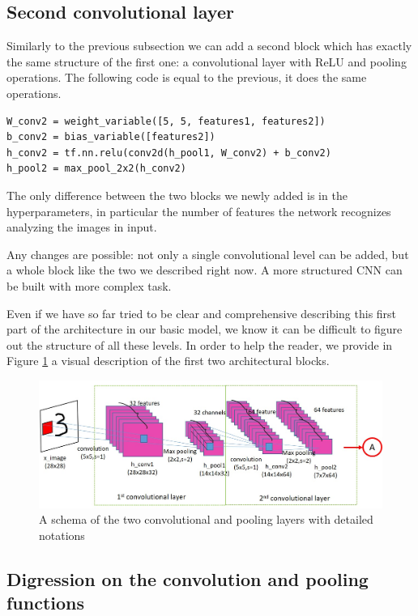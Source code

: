 \subsection{Second convolutional layer}

Similarly to the previous subsection we can add a second block which has exactly the same structure of the first one: a convolutional layer with ReLU and pooling operations. The following code is equal to the previous, it does the same operations.

\begin{lstlisting}
W_conv2 = weight_variable([5, 5, features1, features2])
b_conv2 = bias_variable([features2])
h_conv2 = tf.nn.relu(conv2d(h_pool1, W_conv2) + b_conv2)
h_pool2 = max_pool_2x2(h_conv2)
\end{lstlisting}

The only difference between the two blocks we newly added is in the hyperparameters, in particular the number of features the network recognizes analyzing the images in input.

Any changes are possible: not only a single convolutional level can be added, but a whole block like the two we described right now. A more structured \acs{CNN} can be built with more complex task.

Even if we have so far tried to be clear and comprehensive describing this first part of the architecture in our basic model, we know it can be difficult to figure out the structure of all these levels. In order to help the reader, we provide in Figure \ref{fig:conv_layers} a visual description of the first two architectural blocks.

\begin{figure}
	\caption{A schema of the two convolutional and pooling layers with detailed notations}
	\label{fig:conv_layers}
	\centering
	\includegraphics[width=1\textwidth]{Images/conv_layers}
\end{figure}

\subsection{Digression on the convolution and pooling functions}

